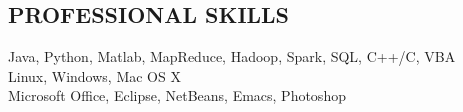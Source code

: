 \documentclass{style/resume}
\begin{document}
\begin{resume}
  \section{PROFESSIONAL SKILLS}
  \vspace{0.1in}
  Java, Python, Matlab, MapReduce, Hadoop, Spark, SQL, C++/C, VBA\\
  Linux, Windows, Mac OS X\\
  Microsoft Office, Eclipse, NetBeans, Emacs, Photoshop

\end{resume}
\end{document}
